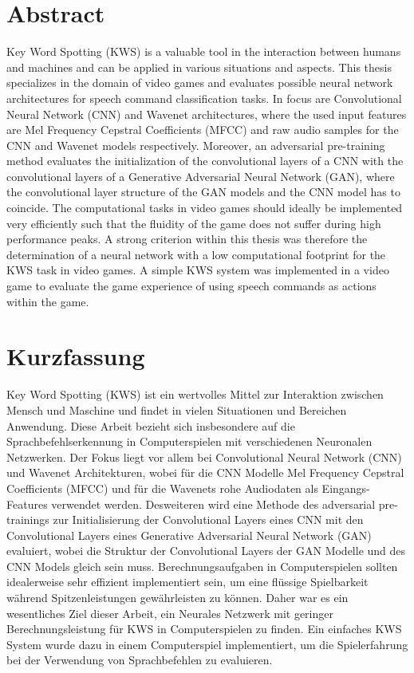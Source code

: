 
\chapter*{Abstract}\label{sec:shards_abstract}
Key Word Spotting (KWS) is a valuable tool in the interaction between humans and machines and can be applied in various situations and aspects.
This thesis specializes in the domain of video games and evaluates possible neural network architectures for speech command classification tasks.
In focus are Convolutional Neural Network (CNN) and Wavenet architectures, where the used input features are Mel Frequency Cepstral Coefficients (MFCC) and raw audio samples for the CNN and Wavenet models respectively.
Moreover, an adversarial pre-training method evaluates the initialization of the convolutional layers of a CNN with the convolutional layers of a Generative Adversarial Neural Network (GAN), where the convolutional layer structure of the GAN models and the CNN model has to coincide.
The computational tasks in video games should ideally be implemented very efficiently such that the fluidity of the game does not suffer during high performance peaks.
A strong criterion within this thesis was therefore the determination of a neural network with a low computational footprint for the KWS task in video games.
A simple KWS system was implemented in a video game to evaluate the game experience of using speech commands as actions within the game.



\chapter*{Kurzfassung}
Key Word Spotting (KWS) ist ein wertvolles Mittel zur Interaktion zwischen Mensch und Maschine und findet in vielen Situationen und Bereichen Anwendung.
Diese Arbeit bezieht sich insbesondere auf die Sprachbefehlserkennung in Computerspielen mit verschiedenen Neuronalen Netzwerken.
Der Fokus liegt vor allem bei Convolutional Neural Network (CNN) und Wavenet Architekturen, wobei für die CNN Modelle Mel Frequency Cepstral Coefficients (MFCC) und für die Wavenets rohe Audiodaten als Eingangs-Features verwendet werden.
Desweiteren wird eine Methode des adversarial pre-trainings zur Initialisierung der Convolutional Layers eines CNN mit den Convolutional Layers eines Generative Adversarial Neural Network (GAN) evaluiert, wobei die Struktur der Convolutional Layers der GAN Modelle und des CNN Models gleich sein muss.
Berechnungsaufgaben in Computerspielen sollten idealerweise sehr effizient implementiert sein, um eine flüssige Spielbarkeit während Spitzenleistungen gewährleisten zu können.
Daher war es ein wesentliches Ziel dieser Arbeit, ein Neurales Netzwerk mit geringer Berechnungsleistung für KWS in Computerspielen zu finden.
Ein einfaches KWS System wurde dazu in einem Computerspiel implementiert, um die Spielerfahrung bei der Verwendung von Sprachbefehlen zu evaluieren.